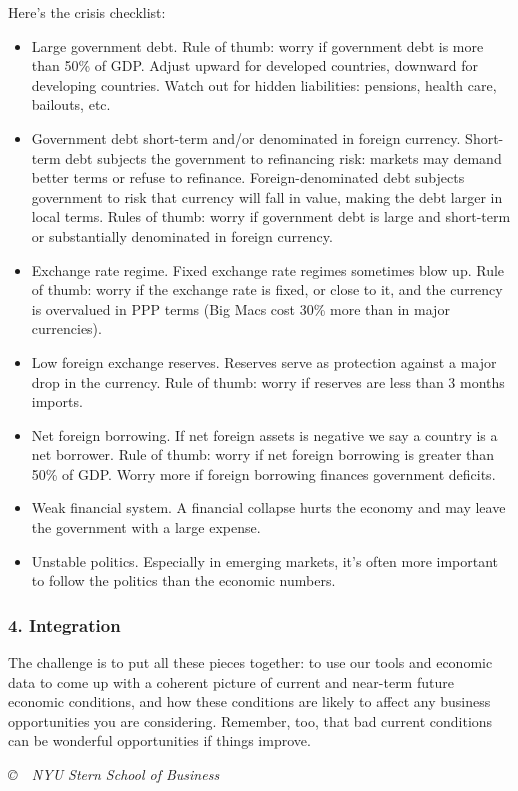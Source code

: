 \documentclass[letterpaper,12pt]{article}
\begin{document}
Here's the crisis checklist:  
%
\begin{itemize}
\item Large government debt.  
Rule of thumb:  worry if government debt is more than 50\% of GDP.  
Adjust upward for developed countries, downward for developing countries. 
Watch out for hidden liabilities:  pensions, health care, bailouts, etc.  

\item Government debt short-term and/or denominated in foreign currency.  
Short-term debt subjects the government to refinancing risk:
 markets may demand better terms or refuse to refinance.  Foreign-denominated debt subjects government to risk
that currency will fall in value, making the debt larger in local terms.  
Rules of thumb:  worry if government debt is large and 
short-term or substantially denominated in foreign currency.  

\item Exchange rate regime.  Fixed exchange rate regimes sometimes 
blow up.  
Rule of thumb:  worry if the exchange rate is fixed, or close to it, 
and the currency is overvalued in PPP terms 
(Big Macs cost 30\% more than 
in major currencies).  

\item Low foreign exchange reserves.  
Reserves serve as protection against a major drop in the currency.
Rule of thumb:  worry if reserves are less than 3 months imports.   

\item Net foreign borrowing.  
If net foreign assets is negative we say a country is a net borrower.
Rule of thumb:  worry if net foreign borrowing is greater than 50\% of GDP. Worry more if foreign borrowing finances government deficits.  

\item Weak financial system. A financial collapse hurts the economy
and may leave the government with a large expense.  

\item Unstable politics.  
Especially in emerging markets, it's often more important to follow the politics than the economic numbers.  
\end{itemize}


\subsubsection*{4. Integration}  

The challenge is to put all these pieces together:  
to use our tools and economic data to come up with a coherent picture of 
current and near-term future economic conditions, 
and how these conditions are likely to affect any business opportunities  
you are considering.  
Remember, too, that bad current conditions can be wonderful opportunities if things improve.  


\vfill \centerline{\it \copyright \ \number\year \ NYU Stern School of Business}
\end{document}
